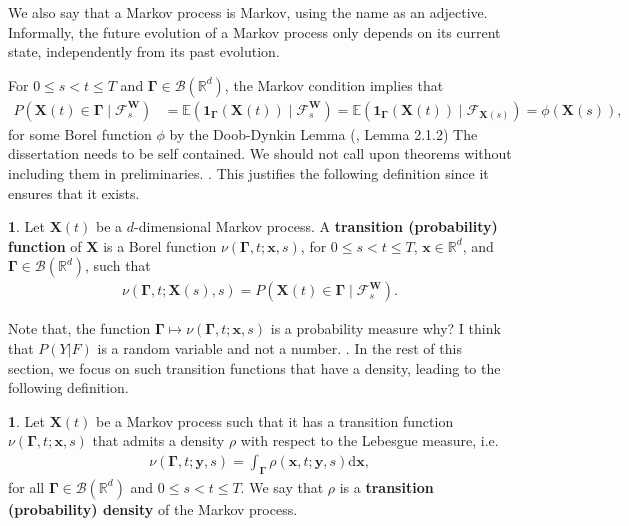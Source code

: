 \documentclass[english]{article}
\newcommand{\comment}[1]{\color{blue}#1\color{black}}
\numberwithin{equation}{section}
\numberwithin{figure}{section}
\theoremstyle{bolddescit}
\theoremstyle{definition}
\newtheorem{definition}[theorem]{\protect\definitionname}
\theoremstyle{definition}
\theoremstyle{plain}
\theoremstyle{plain}
\theoremstyle{bolddesc}
\theoremstyle{plain}
\theoremstyle{remark}
\providecommand{\definitionname}{Definition}
\begin{document}
We also say that a Markov process is Markov, using the name as an adjective. Informally, the future evolution of a Markov process only depends on its current state, independently from its past evolution.

For $0 \le s < t \le T$ and $\mathbf{\Gamma} \in \mathcal{B}({\mathbb{R}^d})$, the Markov condition implies that
\begin{align*}
  P(\mathbf{X}(t) \in \mathbf{\Gamma} \mid \mathcal{F}^\mathbf{W}_s)
  &= \mathbb{E}(\mathbf{1}_\mathbf{\Gamma}(\mathbf{X}(t)) \mid \mathcal{F}^\mathbf{W}_s)
  = \mathbb{E}(\mathbf{1}_\mathbf{\Gamma}(\mathbf{X}(t)) \mid \mathcal{F}_{\mathbf{X}(s)})
  = \phi(\mathbf{X}(s)),
\end{align*}
for some Borel function $\phi$ by the Doob-Dynkin Lemma (\cite{oksendal_stochastic_2003}, Lemma 2.1.2)
\comment{The dissertation needs to be self contained. We should not call upon theorems without including them in preliminaries.}
. This justifies the following definition since it ensures that it exists.

\begin{definition}
  Let $\mathbf{X}(t)$ be a $d$-dimensional Markov process. A \textbf{transition (probability) function} of $\mathbf{X}$ is a Borel function $\nu(\mathbf{\Gamma}, t; \mathbf{x}, s)$, for $0 \le s < t \le T$, $\mathbf{x} \in \mathbb{R}^d$, and $\mathbf{\Gamma} \in \mathcal{B}(\mathbb{R}^d)$, such that
  \begin{align*}
    \nu(\mathbf{\Gamma}, t; \mathbf{X}(s), s) = P(\mathbf{X}(t) \in \mathbf{\Gamma} \mid \mathcal{F}^\mathbf{W}_s).
  \end{align*}
\end{definition}

Note that, the function $\mathbf{\Gamma} \mapsto \nu(\mathbf{\Gamma}, t; \mathbf{x}, s)$ is a probability measure
\comment{why? I think that $P(Y|F)$ is a random variable and not a number.}
. In the rest of this section, we focus on such transition functions that have a density, leading to the following definition.

\begin{definition}
  Let $\mathbf{X}(t)$ be a Markov process such that it has a transition function $\nu(\mathbf{\Gamma},t;\mathbf{x},s)$ that admits a density $\rho$ with respect to the Lebesgue measure, i.e.
  \begin{align*}
    \nu(\mathbf{\Gamma},t;\mathbf{y},s) = \int_\mathbf{\Gamma} \rho(\mathbf{x},t;\mathbf{y},s) \mathrm{d}\mathbf{x},
  \end{align*}
  for all $\mathbf{\Gamma} \in \mathcal{B}(\mathbb{R}^d)$ and $0 \le s < t \le T$.
  We say that $\rho$ is a \textbf{transition (probability) density} of the Markov process.
\end{definition}
\end{document}
